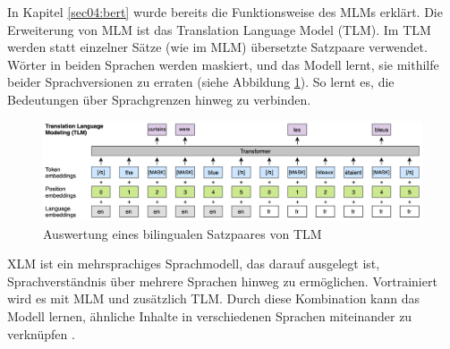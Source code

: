 In Kapitel \ref{sec04:bert} wurde bereits die Funktionsweise des MLMs erklärt. Die Erweiterung von MLM ist das Translation Language Model (TLM).
Im TLM werden statt einzelner Sätze (wie im MLM) übersetzte Satzpaare verwendet. Wörter in beiden Sprachen werden maskiert, und das Modell lernt, 
sie mithilfe beider Sprachversionen zu erraten (siehe Abbildung \ref{fig:translation_language_modeling}). So lernt es, die Bedeutungen über Sprachgrenzen hinweg zu 
verbinden.

\begin{figure}[htbp]
    \begin{center}
    \includegraphics[width=\linewidth]{static/translation_language_modeling.png}
    \caption{\label{fig:translation_language_modeling} Auswertung eines bilingualen Satzpaares von TLM \cite{NEURIPS2019_c04c19c2}}
    \end{center}
\end{figure}

XLM ist ein mehrsprachiges Sprachmodell, das darauf ausgelegt ist, Sprachverständnis über mehrere Sprachen hinweg zu ermöglichen.
Vortrainiert wird es mit MLM und zusätzlich TLM.
Durch diese Kombination kann das Modell lernen, ähnliche Inhalte in verschiedenen Sprachen miteinander zu verknüpfen \cite{NEURIPS2019_c04c19c2}.